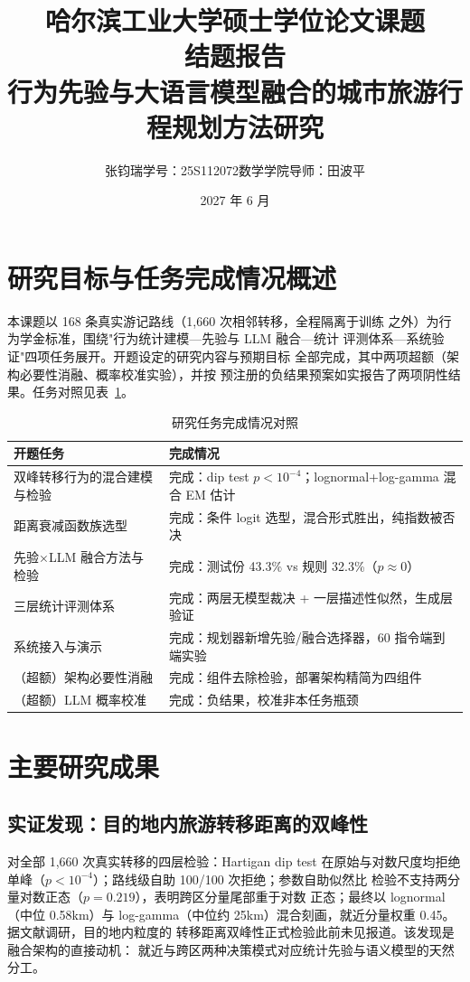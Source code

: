 \documentclass[UTF8,zihao=-4,a4paper]{ctexart}
\title{\heiti 哈尔滨工业大学硕士学位论文课题\\结题报告\\[0.5em]
\large 行为先验与大语言模型融合的城市旅游行程规划方法研究}
\author{张钧瑞\quad 学号：25S112072\quad 数学学院\quad 导师：田波平}
\date{2027 年 6 月}
\begin{document}
\maketitle
\tableofcontents
\newpage

\section{研究目标与任务完成情况概述}

本课题以 168 条真实游记路线（1{,}660 次相邻转移，全程隔离于训练
之外）为行为学金标准，围绕"行为统计建模—先验与 LLM 融合—统计
评测体系—系统验证"四项任务展开。开题设定的研究内容与预期目标
全部完成，其中两项超额（架构必要性消融、概率校准实验），并按
预注册的负结果预案如实报告了两项阴性结果。任务对照见表~\ref{tab:tasks}。

\begin{table}[htbp]
\centering\small
\caption{研究任务完成情况对照}\label{tab:tasks}
\begin{tabular}{p{}p{}}
\toprule
开题任务 & 完成情况 \\
\midrule
双峰转移行为的混合建模与检验 & 完成：dip test $p<10^{-4}$；lognormal+log-gamma 混合 EM 估计 \\
距离衰减函数族选型 & 完成：条件 logit 选型，混合形式胜出，纯指数被否决 \\
先验×LLM 融合方法与检验 & 完成：测试份 43.3\% vs 规则 32.3\%（$p\approx0$） \\
三层统计评测体系 & 完成：两层无模型裁决 + 一层描述性似然，生成层验证 \\
系统接入与演示 & 完成：规划器新增先验/融合选择器，60 指令端到端实验 \\
（超额）架构必要性消融 & 完成：组件去除检验，部署架构精简为四组件 \\
（超额）LLM 概率校准 & 完成：负结果，校准非本任务瓶颈 \\
\bottomrule
\end{tabular}
\end{table}

\section{主要研究成果}

\subsection{实证发现：目的地内旅游转移距离的双峰性}

对全部 1{,}660 次真实转移的四层检验\cite{hartigan1985dip,
efron1993bootstrap}：Hartigan dip test 在原始与对数尺度均拒绝
单峰（$p<10^{-4}$）；路线级自助 100/100 次拒绝；参数自助似然比
检验不支持两分量对数正态（$p=0.219$），表明跨区分量尾部重于对数
正态；最终以 lognormal（中位 0.58km）与 log-gamma（中位约
25km）混合刻画，就近分量权重 0.45。据文献调研，目的地内粒度的
转移距离双峰性正式检验此前未见报道。该发现是融合架构的直接动机：
就近与跨区两种决策模式对应统计先验与语义模型的天然分工。
\end{document}
